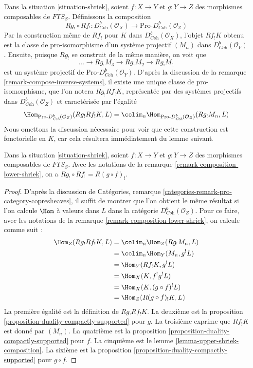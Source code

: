 \begin{remark}
\label{remark-composition-lower-shriek}
Dans la situation \ref{situation-shriek}, soient $f : X \to Y$ et $g : Y \to Z$ des morphismes composables de $\textit{FTS}_S$. Définissons la composition
$$
Rg_! \circ Rf_! :
D^b_{\textit{Coh}}(\mathcal{O}_X)
\longrightarrow
\text{Pro-}D^b_{\textit{Coh}}(\mathcal{O}_Z)
$$
Par la construction même de $Rf_!$ pour $K$ dans $D^b_{\textit{Coh}}(\mathcal{O}_X)$, l'objet $Rf_!K$ obtenu est la classe de pro-isomorphisme d'un système projectif $(M_n)$ dans $D^b_{\textit{Coh}}(\mathcal{O}_Y)$. Ensuite, puisque $Rg_!$ se construit de la même manière, on voit que
$$
\ldots \to Rg_!M_3 \to Rg_!M_2 \to Rg_!M_1
$$
est un système projectif de $\text{Pro-}D^b_{\textit{Coh}}(\mathcal{O}_Y)$. D'après la discussion de la remarque \ref{remark-compose-inverse-systems}, il existe une unique classe de pro-isomorphisme, que l'on notera $Rg_! Rf_! K$, représentée par des systèmes projectifs dans $D^b_{\textit{Coh}}(\mathcal{O}_Z)$ et caractérisée par l'égalité
$$
\Hom_{\text{Pro-}D^b_{\textit{Coh}}(\mathcal{O}_Z)}(Rg_!Rf_!K, L) =
\colim_n \Hom_{\text{Pro-}D^b_{\textit{Coh}}(\mathcal{O}_Z)}(Rg_!M_n, L)
$$
Nous omettons la discussion nécessaire pour voir que cette construction est fonctorielle en $K$, car cela résultera immédiatement du lemme suivant.
\end{remark}

\begin{lemma}
\label{lemma-composition-lower-shriek}
Dans la situation \ref{situation-shriek}, soient $f : X \to Y$ et $g : Y \to Z$ des morphismes composables de $\textit{FTS}_S$. Avec les notations de la remarque \ref{remark-composition-lower-shriek}, on a
$Rg_! \circ Rf_! = R(g \circ f)_!$.
\end{lemma}

\begin{proof}
D'après la discussion de Catégories, remarque \ref{categories-remark-pro-category-copresheaves}, il suffit de montrer que l'on obtient le même résultat si l'on calcule $\Hom$ à valeurs dans $L$ dans la catégorie $D^b_{\textit{Coh}}(\mathcal{O}_Z)$. Pour ce faire, avec les notations de la remarque \ref{remark-composition-lower-shriek}, on calcule comme suit :
\begin{align*}
\Hom_Z(Rg_!Rf_!K, L)
& =
\colim_n \Hom_Z(Rg_!M_n, L) \\
& =
\colim_n \Hom_Y(M_n, g^!L) \\
& =
\Hom_Y(Rf_!K, g^!L) \\
& =
\Hom_X(K, f^!g^!L) \\
& =
\Hom_X(K, (g \circ f)^!L) \\
& =
\Hom_Z(R(g \circ f)_!K, L)
\end{align*}
La première égalité est la définition de $Rg_!Rf_!K$. La deuxième est la proposition \ref{proposition-duality-compactly-supported} pour $g$. La troisième exprime que $Rf_!K$ est donné par $(M_n)$. La quatrième est la proposition \ref{proposition-duality-compactly-supported} pour $f$. La cinquième est le lemme \ref{lemma-upper-shriek-composition}. La sixième est la proposition \ref{proposition-duality-compactly-supported} pour $g \circ f$.
\end{proof}

